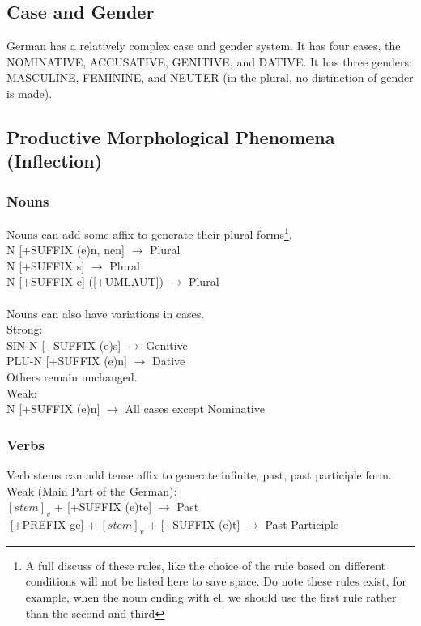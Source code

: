 \documentclass[11pt,letterpaper]{article}
\begin{document}
\subsection{Case and Gender}
German has a relatively complex case and gender system. It has four cases, the NOMINATIVE, ACCUSATIVE, GENITIVE, and DATIVE. It has three genders: MASCULINE, FEMININE, and NEUTER (in the plural, no distinction of gender is made).

\subsection{Productive Morphological Phenomena (Inflection)}

\subsubsection{Nouns}
Nouns can add some affix to generate their plural forms\footnote{A full discuss of these rules, like the choice of the rule based on different conditions will not be listed here to save space. Do note these rules exist, for example, when the noun ending with el, we should use the first rule rather than the second and third}.\\
N [+SUFFIX (e)n, nen] $\rightarrow$ Plural\\
N [+SUFFIX s]  $\rightarrow$ Plural\\
N [+SUFFIX e] ([+UMLAUT]) $\rightarrow$ Plural\\\\
Nouns can also have variations in cases.\\
Strong:\\
SIN-N [+SUFFIX (e)s] $\rightarrow$ Genitive\\
PLU-N [+SUFFIX (e)n] $\rightarrow$ Dative\\
Others remain unchanged.\\
Weak:\\
N [+SUFFIX (e)n] $\rightarrow$ All cases except Nominative\\
\subsubsection{Verbs}
Verb stems can add tense affix to generate infinite, past, past participle form.\\
Weak (Main Part of the German):\\
$[stem]_v$ + [+SUFFIX (e)te] $\rightarrow$ Past\\
$ $ [+PREFIX ge] + $[stem]_v$ + [+SUFFIX (e)t] $\rightarrow$ Past Participle
\end{document}
